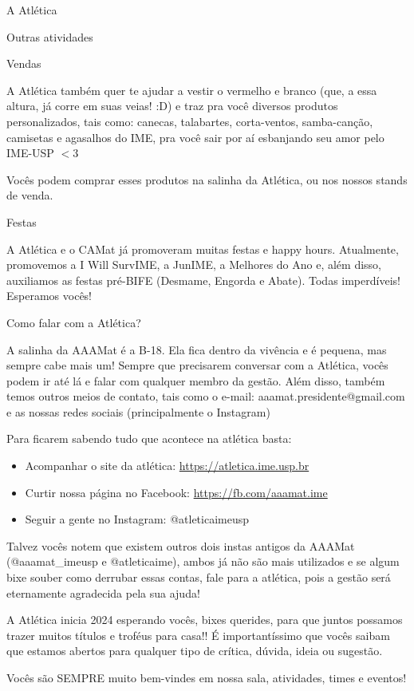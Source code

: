 \begin{secao}{A Atlética}
\begin{subsecao}{Outras atividades}
\begin{subsubsecao}{Vendas}

A Atlética também quer te ajudar a vestir o vermelho e branco (que, a essa
altura, já corre em suas veias! :D) e traz pra você diversos produtos
personalizados, tais como: canecas, talabartes, corta-ventos,
samba-canção, camisetas e agasalhos do
IME, pra você sair por aí esbanjando seu amor pelo IME-USP $<$3

Vocês podem comprar esses produtos na salinha da Atlética, ou nos nossos
stands de venda.

\end{subsubsecao}
\begin{subsubsecao}{Festas}

A Atlética e o CAMat já promoveram muitas festas e happy hours. Atualmente,
promovemos a I Will SurvIME, a JunIME, a Melhores do Ano e, além disso, 
auxiliamos as festas pré-BIFE (Desmame, Engorda e Abate). Todas imperdíveis!
Esperamos vocês!

\end{subsubsecao}
\begin{subsubsecao}{Como falar com a Atlética?}

A salinha da AAAMat é a B-18. Ela fica dentro da vivência e é pequena, mas
sempre cabe mais um! Sempre que precisarem conversar com a Atlética, vocês
podem ir até lá e falar com qualquer membro da gestão. Além disso, também temos
outros meios de contato, tais como o e-mail: aaamat.presidente@gmail.com  e as
nossas redes sociais (principalmente o Instagram)

Para ficarem sabendo tudo que acontece na atlética basta:

\begin{itemize}
  \item Acompanhar o site da atlética: \url{https://atletica.ime.usp.br}
  \item Curtir nossa página no Facebook: \url{https://fb.com/aaamat.ime}
  \item Seguir a gente no Instagram: @atleticaimeusp
\end{itemize}

Talvez vocês notem que existem outros dois instas antigos da AAAMat
(@aaamat\_imeusp e @atleticaime), ambos já não são mais utilizados
e se algum bixe souber como derrubar essas contas, fale para a atlética, 
pois a gestão será eternamente agradecida pela sua ajuda! 

A Atlética inicia 2024 esperando vocês, bixes querides, para que juntos
possamos trazer muitos títulos e troféus para casa!! É importantíssimo que
vocês saibam que estamos abertos para qualquer tipo de crítica, dúvida, ideia
ou sugestão.

Vocês são SEMPRE muito bem-vindes em nossa sala, atividades, times e eventos!
\end{subsubsecao}
\end{subsecao}
\end{secao}
\pagebreak
